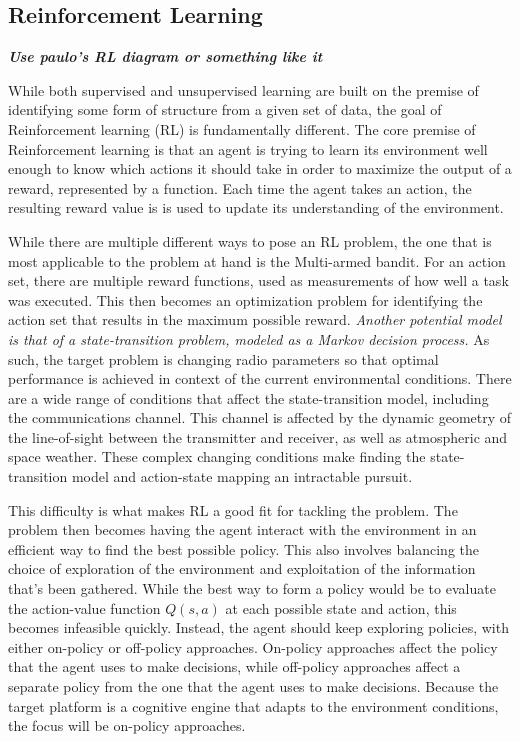 \documentclass[11pt]{report}
\begin{document}
	\subsection{Reinforcement Learning}
	\textbf{\textit{Use paulo's RL diagram or something like it}}
	\par While both supervised and unsupervised learning are built on the premise of identifying some form of structure from a given set of data, the goal of Reinforcement learning (RL) is fundamentally different. The core premise of Reinforcement learning is that an agent is trying to learn its environment well enough to know which actions it should take in order to maximize the output of a reward, represented by a function. Each time the agent takes an action, the resulting reward value is is used to update its understanding of the environment.
	\par While there are multiple different ways to pose an RL problem, the one that is most applicable to the problem at hand is the Multi-armed bandit. For an action set, there are multiple reward functions, used as measurements of how well a task was executed. This then becomes an optimization problem for identifying the action set that results in the maximum possible reward. \textit{Another potential model is that of a state-transition problem, modeled as a Markov decision process.} As such, the target problem is changing radio parameters so that optimal performance is achieved in context of the current environmental conditions. There are a wide range of conditions that affect the state-transition model, including the communications channel. This channel is affected by the dynamic geometry of the line-of-sight between the transmitter and receiver, as well as atmospheric and space weather. These complex changing conditions make finding the state-transition model and action-state mapping an intractable pursuit. 
	\par This difficulty is what makes RL a good fit for tackling the problem. The problem then becomes having the agent interact with the environment in an efficient way to find the best possible policy. This also involves balancing the choice of exploration of the environment and exploitation of the information that's been gathered. While the best way to form a policy would be to evaluate the action-value function $Q(s,a)$ at each possible state and action, this becomes infeasible quickly. Instead, the agent should keep exploring policies, with either on-policy or off-policy approaches. On-policy approaches affect the policy that the agent uses to make decisions, while off-policy approaches affect a separate policy from the one that the agent uses to make decisions. Because the target platform is a cognitive engine that adapts to the environment conditions, the focus will be on-policy approaches. 
\end{document}
